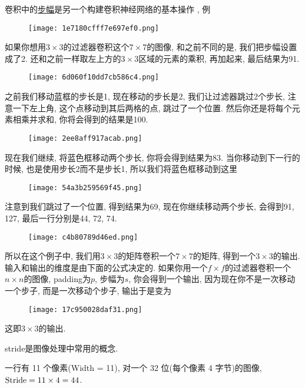 
\begin{example}
卷积中的\href{https://blog.csdn.net/weicao1990/article/details/80282837}{步幅}是另一个构建卷积神经网络的基本操作 , 例
\begin{figure}[H]
    \centering
    \texttt{[image: 1e7180cfff7e697ef0.png]}
\end{figure}
如果你想用$3\times 3$的过滤器卷积这个$7\times 7$的图像, 和之前不同的是, 我们把步幅设置成了2.
还和之前一样取左上方的$3\times 3$区域的元素的乘积, 再加起来, 最后结果为91.
\begin{figure}[H]
    \centering
    \texttt{[image: 6d060f10dd7cb586c4.png]}
\end{figure}
之前我们移动蓝框的步长是1, 现在移动的步长是2, 我们让过滤器跳过2个步长, 注意一下左上角, 这个点移动到其后两格的点, 跳过了一个位置.
然后你还是将每个元素相乘并求和, 你将会得到的结果是100.
\begin{figure}[H]
    \centering
    \texttt{[image: 2ee8aff917acab.png]}
\end{figure}
现在我们继续, 将蓝色框移动两个步长, 你将会得到结果为83.
当你移动到下一行的时候, 也是使用步长2而不是步长1, 所以我们将蓝色框移动到这里
\begin{figure}[H]
    \centering
    \texttt{[image: 54a3b259569f45.png]}
\end{figure}
注意到我们跳过了一个位置, 得到结果为69, 现在你继续移动两个步长, 会得到91, 127, 最后一行分别是44, 72, 74.
\begin{figure}[H]
    \centering
    \texttt{[image: c4b80789d46ed.png]}
\end{figure}
所以在这个例子中, 我们用$3\times 3$的矩阵卷积一个$7\times 7$的矩阵, 得到一个$3\times 3$的输出.
输入和输出的维度是由下面的公式决定的.
如果你用一个$f\times f$的过滤器卷积一个$n\times n$的图像, padding为$p$, 步幅为$s$,
你会得到一个输出, 因为现在你不是一次移动一个步子, 而是一次移动个步子, 输出于是变为
\begin{figure}[H]
    \centering
    \texttt{[image: 17c950028daf31.png]}
\end{figure}
这即$3\times 3$的输出.
\end{example}
\begin{remark}
stride是图像处理中常用的概念.
\begin{example}
    一行有 11 个像素(Width = 11), 对一个 32 位(每个像素 4 字节)的图像, $\textup{Stride}= 11 \times 4 = 44$.
\end{example}
\end{remark}

